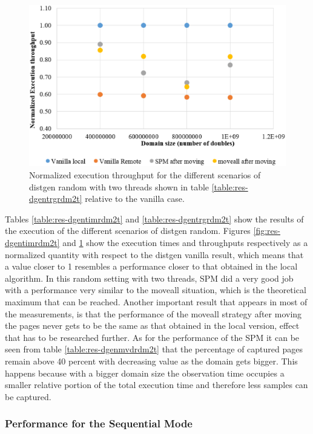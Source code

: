 \begin{figure}[th]
	\centering
		\includegraphics[width=.8\textwidth]{figures/thrput-dgentt-randm.eps}
		\caption{Normalized execution throughput for the different scenarios of distgen random with two threads shown in table \ref{table:res-dgentrgrdm2t} relative to the vanilla case.}
		\label{fig:res-dgentrgrdm2t}
\end{figure}

Tables \ref{table:res-dgentimrdm2t} and \ref{table:res-dgentrgrdm2t} show the results of the execution of the different scenarios of distgen random. Figures \ref{fig:res-dgentimrdm2t} and \ref{fig:res-dgentrgrdm2t} show the execution times and throughputs respectively as a normalized quantity with respect to the distgen vanilla result, which means that a value closer to 1 resembles a performance closer to that obtained in the local algorithm. In this random setting with two threads, SPM did a very good job with a performance very similar to the moveall situation, which is the theoretical maximum that can be reached. Another important result that appears in most of the measurements, is that the performance of the moveall strategy after moving the pages never gets to be the same as that obtained in the local version, effect that has to be researched further.
As for the performance of the SPM it can be seen from table \ref{table:res-dgenmvdrdm2t} that the percentage of captured pages remain above 40 percent with decreasing value as the domain gets bigger. This happens because with a bigger domain size the observation time occupies a smaller relative portion of the total execution time and therefore less samples can be captured.

\FloatBarrier
\subsubsection{Performance for the Sequential Mode}\label{subsection:res-dgseq-2t}

